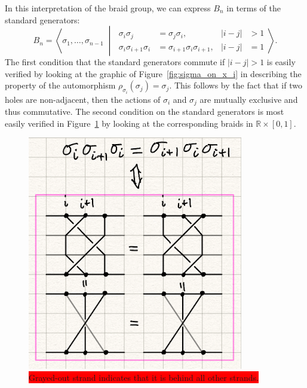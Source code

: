 \documentclass[12pt]{report}
\newcommand{\R}{\mathbb{R}}
\theoremstyle{definition}
\begin{document}
In this interpretation of the braid group, we can express $B_n$ in terms of the standard generators:
\begin{equation}
    B_n = \left\langle \sigma_1,\dots,\sigma_{n-1} \;\middle|\;
    \begin{aligned}
        \sigma_i\sigma_j &= \sigma_j\sigma_i, & |i-j|&>1 \\
        \sigma_i\sigma_{i+1}\sigma_i &= \sigma_{i+1}\sigma_i\sigma_{i+1}, & |i-j|&=1
    \end{aligned}
    \right\rangle.
\end{equation}
The first condition that the standard generators commute if $|i-j|>1$ is easily verified by looking at the graphic of Figure~\ref{fig:sigma_on_x_i} in describing the property of the automorphism $\rho_{\sigma_i}(\sigma_j) = \sigma_j$. This follows by the fact that if two holes are non-adjacent, then the actions of $\sigma_i$ and $\sigma_j$ are mutually exclusive and thus commutative. The second condition on the standard generators is most easily verified in Figure~\ref{fig:YB_criterion_verification} by looking at the corresponding braids in $\R\times[0,1]$.
\begin{figure}[htbp]
    \centering
    \includegraphics[width = .5\textwidth]{sketch_YB_citerion_verification.png}
    \caption{\colorbox{red}{Grayed-out strand indicates that it is behind all other strands.}}\label{fig:YB_criterion_verification}
\end{figure}



\end{document}
